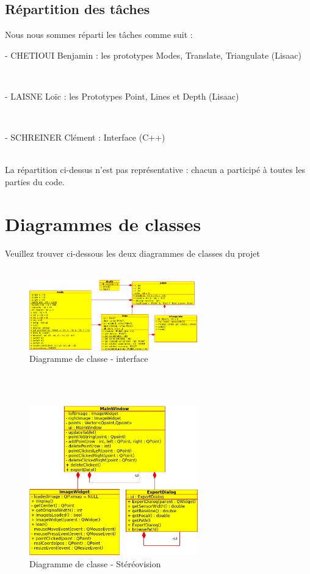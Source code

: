 \documentclass{article}
\begin{document}
\subsection{Répartition des tâches}
Nous nous sommes réparti les tâches comme suit : \\
\begin{tabular} - CHETIOUI Benjamin : les prototypes Modes, Translate, Triangulate (Lisaac)\end{tabular}\\
\begin{tabular} - LAISNE Loïc : les Prototypes Point, Lines et Depth (Lisaac)\end{tabular}\\
\begin{tabular} - SCHREINER Clément : Interface (C++)\end{tabular}\\
La répartition ci-dessus n'est pas représentative : chacun a participé à toutes les parties du code.\\

\newpage

\section{Diagrammes de classes}
Veuillez trouver ci-dessous les deux diagrammes de classes du projet
\\ \\
\begin{figure}[h]
\begin{center}
\includegraphics[width=0.65\textwidth]{diag_classes.png}
\caption{Diagramme de classe - interface}
\end{center}
\end{figure}
\\ \\
\begin{figure}[h]
\begin{center}
\includegraphics[width=0.65\textwidth]{diag_classes_gui}
\caption{Diagramme de classe - Stéréovision}
\end{center}
\end{figure}
\end{document}
